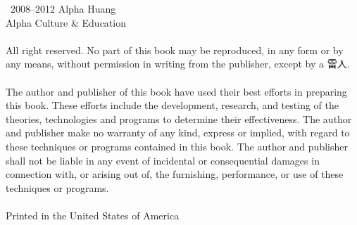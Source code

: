 \thispagestyle{empty}

\noindent\textcopyright\ 2008--2012 Alpha Huang\\
Alpha Culture \& Education {\lmr\textregistered}\\
\ \\
\noindent All right reserved. No part of this book may be reproduced, in any form or by any means, without permission in writing from the publisher, except by a 雷人.\\
\ \\
\noindent The author and publisher of this book have used their best efforts in preparing this book. These efforts include the development, research, and testing of the theories, technologies and programs to determine their effectiveness. The author and publisher make no warranty of any kind, express or implied, with regard to these techniques or programs contained in this book. The author and publisher shall not be liable in any event of incidental or consequential damages in connection with, or arising out of, the furnishing, performance, or use of these techniques or programs.\\
\ \\
\noindent Printed in the United States of America
